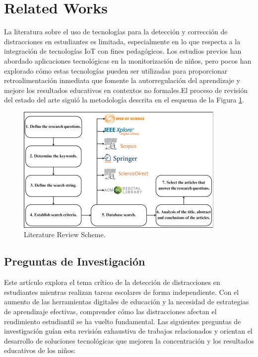 \documentclass[a4paper,fleqn]{cas-sc}
\begin{document}
	\section{Related Works}
		\label{seccion:Tres}
		La literatura sobre el uso de tecnologías para la detección y corrección de distracciones en estudiantes es limitada, especialmente en lo que respecta a la integración de tecnologías IoT con fines pedagógicos. Los estudios previos han abordado aplicaciones tecnológicas en la monitorización de niños, pero pocos han explorado cómo estas tecnologías pueden ser utilizadas para proporcionar retroalimentación inmediata que fomente la autorregulación del aprendizaje y mejore los resultados educativos en contextos no formales.El proceso de revisión del estado del arte siguió la metodología descrita en el esquema de la Figura \ref{fig:LRS}.
		
		\begin{figure}[h]
			\includegraphics[width=\textwidth]{Figure_1}
			\caption{Literature Review Scheme.}
			\label{fig:LRS}
		\end{figure}   

		\subsection{Preguntas de Investigación}
			Este artículo explora el tema crítico de la detección de distracciones en estudiantes mientras realizan tareas escolares de forma independiente. Con el aumento de las herramientas digitales de educación y la necesidad de estrategias de aprendizaje efectivas, comprender cómo las distracciones afectan el rendimiento estudiantil se ha vuelto fundamental. Las siguientes preguntas de investigación guían esta revisión exhaustiva de trabajos relacionados y orientan el desarrollo de soluciones tecnológicas que mejoren la concentración y los resultados educativos de los niños:
		
\end{document}
